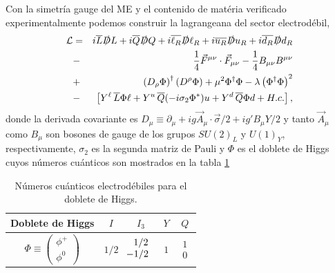 Con la simetría gauge del ME y el contenido de matéria verificado experimentalmente podemos construir la lagrangeana del sector electrodébil,
\begin{eqnarray}
\mathcal{L} &=& i \overline{L} \slashed{D} L + i \overline{Q} \slashed{D} Q + i \overline{\ell_R} \slashed{D} \ell_R +  i \overline{u_R} \slashed{D} u_R + i \overline{d_R} \slashed{D} d_R  \nonumber \\
            &-& \frac{1}{4} \vec{F}^{\mu \nu} \cdot \vec{F}_{\mu \nu} -\frac{1}{4}B_{\mu \nu} B^{\mu \nu} \nonumber \\
             &+&\left(D_\rho \Phi \right)^\dagger \left( D^\rho \Phi \right) + \mu^2 \Phi^\dagger \Phi - \lambda \left( \Phi^\dagger \Phi \right)^2 \nonumber \\
             &-& \left[ Y^{\ell}\, \overline{L}\Phi \ell + Y^{u}\, \overline{Q}(-i\sigma_2 \Phi^*) u + Y^{d}\, \overline{Q}\Phi d  + H.c.  \right],
\end{eqnarray}
donde la derivada covariante es $D_\mu \equiv \partial_\mu + ig\vec{A}_\mu \cdot\vec{\sigma}/2 +ig' B_\mu Y/2$ y tanto $\vec{A}_\mu$ como $B_\mu$ son bosones de gauge de los grupos $SU(2)_L$ y $U(1)_Y$, respectivamente, $\sigma_2$ es la segunda matriz de Pauli y $\Phi$ es el doblete de Higgs cuyos números cuánticos son mostrados en la tabla \ref{table2}

\begin{table}[h]
\caption{\hspace{-0.15in}Números cuánticos electrodébiles para el doblete de Higgs.}
\begin{center}
\begin{small}
\begin{tabular}{|c | c | c | c | c|} 
 \hline
Doblete de Higgs & $I$ & $I_3$ & $Y$ & $Q$ \\ [1ex] 
 \hline\hline
 $\Phi \equiv 
	\begin{pmatrix}
	\phi^+ \\
	\phi^0 
	\end{pmatrix} $ & $1/2$ & $\begin{array}{c} 1/2 \\ \hspace{-0.1in} -1/2 \end{array}$	 & $1$ & $\begin{array}{c} 1 \\ 0 \end{array}$ \\ 
[1ex]
 \hline
\end{tabular}
\end{small}
\label{table2}
\end{center}
\end{table}

